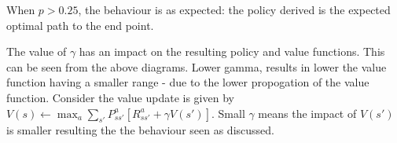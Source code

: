 When $p > 0.25$, the behaviour is as expected: the policy derived
is the expected optimal path to the end point.

The value of $\gamma$ has an impact on the resulting policy 
and value functions. This can be seen from the above diagrams.
Lower gamma, results in lower the value function having a smaller 
range - due to the lower propogation of the value function. 
Consider the value update is given by 
$V(s) \leftarrow \max_a \sum_{s'} P^a_{ss'}[R^a_{ss'} + \gamma V(s')]$.
Small $\gamma$ means the impact of $V(s')$ is smaller resulting the 
the behaviour seen as discussed.